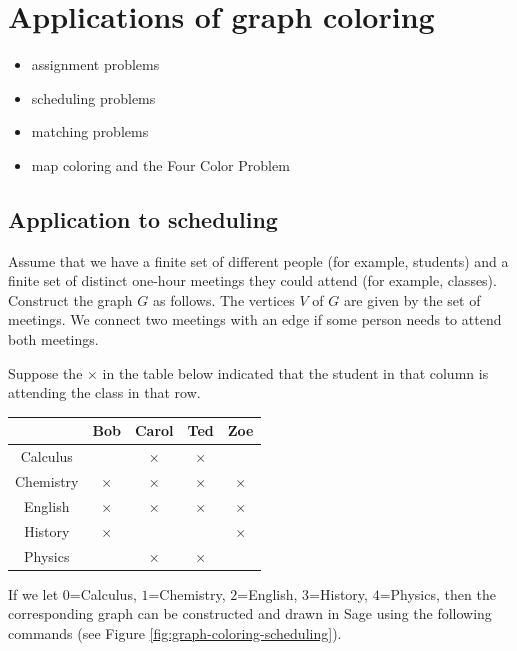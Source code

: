 

\section{Applications of graph coloring}

\begin{itemize}
\item assignment problems

\item scheduling problems

\item matching problems

\item map coloring and the Four Color Problem
\end{itemize}


\subsection{Application to scheduling}

Assume that we have a finite set of different people (for example, students)
and a finite set of distinct one-hour meetings they could attend (for example,
classes). Construct the
graph $G$ as follows. The vertices $V$ of $G$ are given by the set of
meetings. We connect two meetings with an edge if some person
needs to attend both meetings.

\begin{example}
\label{eg:coloring}
Suppose the $\times$ in the table below
indicated that the student in that column is attending the class in that
row.

\begin{center}
\begin{tabular}{c|cccc}
                  &  Bob            &  Carol         &       Ted      &    Zoe   \\ \hline
Calculus          &                 &    $\times$   &  $\times$      &           \\
Chemistry        &    $\times$     &   $\times$   &    $\times$   &    $\times$   \\
English            &    $\times$     &   $\times$   &    $\times$   &    $\times$   \\
History          &    $\times$     &              &             &    $\times$     \\
Physics          &                    &    $\times$  &    $\times$    &    \\  \hline

\end{tabular}
\end{center}

If we let $0$=Calculus, $1$=Chemistry, $2$=English,
$3$=History, $4$=Physics, then the corresponding graph can be
constructed and drawn in Sage using the following commands
(see Figure \ref{fig:graph-coloring-scheduling}).
\end{example}

